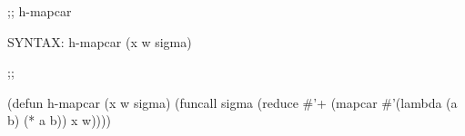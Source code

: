 \begin{aibox}{\function}
;; h-mapcar

SYNTAX: h-mapcar (x w sigma) 
\end{aibox}

\begin{aibox}{\examples}

\end{aibox}

\begin{aibox}{\comments}

\end{aibox}
\begin{aibox}{\answers}

\end{aibox}
\begin{aibox}{\othercomments}

\end{aibox}
\begin{aibox}{\pseudocode}

\end{aibox}
\begin{aibox}{\code}

;;%

(defun h-mapcar (x w sigma) 
	(funcall sigma 
		(reduce #'+
			(mapcar #'(lambda (a b) (* a b)) x w))))

\end{aibox}
